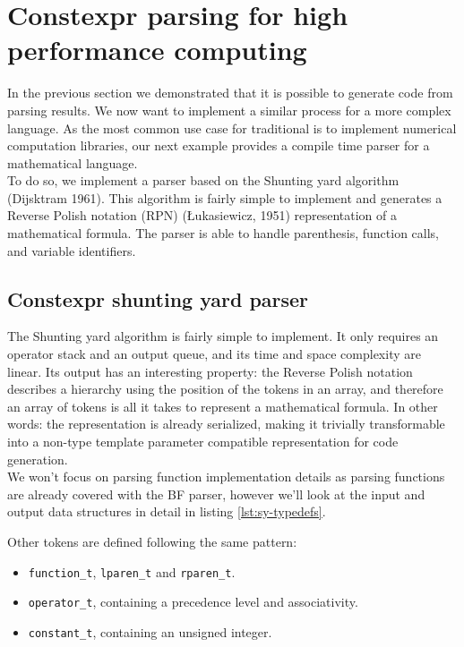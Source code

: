 \documentclass[../../main.tex]{subfiles}
\begin{document}
\section{Constexpr parsing for high performance computing}

In the previous section we demonstrated that it is possible to generate code
from \constexpr parsing results. We now want to implement a similar process for
a more complex language. As the most common use case for traditional
\cpp \dsel is to implement numerical computation libraries, our next example
provides a compile time parser for a mathematical language.\\

To do so, we implement a \constexpr parser based on the Shunting
yard algorithm (Dijsktram 1961). This algorithm is fairly simple to implement
and generates a Reverse Polish notation (RPN) (Łukasiewicz, 1951) representation
of a mathematical formula. The parser is able to handle parenthesis, function calls,
and variable identifiers.

\subsection{Constexpr shunting yard parser}

The Shunting yard algorithm is fairly simple to implement. It only requires an
operator stack and an output queue, and its time and space complexity are
linear. Its output has an interesting property: the Reverse Polish notation
describes a hierarchy using the position of the tokens in an array, and
therefore an array of tokens is all it takes to represent a mathematical formula.
In other words: the representation is already serialized, making it trivially
transformable into a non-type template parameter compatible representation for
code generation.\\

We won't focus on parsing function implementation details as
\constexpr parsing functions are already covered with the BF parser, however
we'll look at the input and output data structures in detail in
listing \ref{lst:sy-typedefs}.



Other tokens are defined following the same pattern:

\begin{itemize}
\item \lstinline|function_t|, \lstinline|lparen_t| and \lstinline|rparen_t|.
\item \lstinline|operator_t|, containing a precedence level and associativity.
\item \lstinline|constant_t|, containing an unsigned integer.
\end{itemize}
\end{document}
